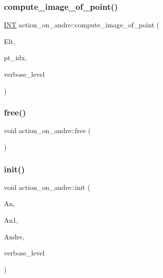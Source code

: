\subsubsection{\texorpdfstring{compute\+\_\+image\+\_\+of\+\_\+point()}{compute\_image\_of\_point()}}
{\footnotesize\ttfamily \mbox{\hyperlink{galois_8h_a09fddde158a3a20bd2dcadb609de11dc}{I\+NT}} action\+\_\+on\+\_\+andre\+::compute\+\_\+image\+\_\+of\+\_\+point (\begin{DoxyParamCaption}\item[{\mbox{\hyperlink{galois_8h_a09fddde158a3a20bd2dcadb609de11dc}{I\+NT}} $\ast$}]{Elt,  }\item[{\mbox{\hyperlink{galois_8h_a09fddde158a3a20bd2dcadb609de11dc}{I\+NT}}}]{pt\+\_\+idx,  }\item[{\mbox{\hyperlink{galois_8h_a09fddde158a3a20bd2dcadb609de11dc}{I\+NT}}}]{verbose\+\_\+level }\end{DoxyParamCaption})}

\mbox{\label{classaction__on__andre_ade5ab62528466047a3400f34e95f67d8}} 
\subsubsection{\texorpdfstring{free()}{free()}}
{\footnotesize\ttfamily void action\+\_\+on\+\_\+andre\+::free (\begin{DoxyParamCaption}{ }\end{DoxyParamCaption})}

\mbox{\label{classaction__on__andre_a4022d93d8462092627dc718a77989daa}} 
\subsubsection{\texorpdfstring{init()}{init()}}
{\footnotesize\ttfamily void action\+\_\+on\+\_\+andre\+::init (\begin{DoxyParamCaption}\item[{\mbox{\hyperlink{classaction}{action}} $\ast$}]{An,  }\item[{\mbox{\hyperlink{classaction}{action}} $\ast$}]{An1,  }\item[{\mbox{\hyperlink{classandre__construction}{andre\+\_\+construction}} $\ast$}]{Andre,  }\item[{\mbox{\hyperlink{galois_8h_a09fddde158a3a20bd2dcadb609de11dc}{I\+NT}}}]{verbose\+\_\+level }\end{DoxyParamCaption})}

